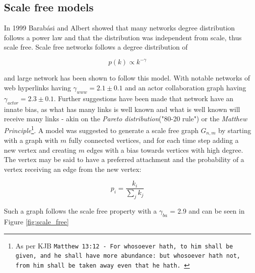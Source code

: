 


\subsection{Scale free models}

In 1999 Barabási and Albert showed that many networks degree distribution follows a power law and that the distribution was independent from scale, thus scale free\cite{barabasi:albert:emergent:scaling}. Scale free networks follows a degree distribution of

\begin{equation}
	 p(k) \propto k^{-\gamma} 
	\label{eq:scale:free}
\end{equation}

and large network has been shown to follow this model. With notable networks of web hyperlinks having $\gamma_{www} = 2.1\pm 0.1$ and an actor collaboration graph having $\gamma_{actor} = 2.3\pm0.1$. Further suggestions have been made that network have an innate bias, as what has many links is well known and what is well known will receive many links - akin on the \textit{Pareto distribution}("80-20 rule") or the \textit{Matthew Principle}\footnote{As per KJB \texttt{Matthew 13:12 - For whosoever hath, to him shall be given, and he shall have more abundance: but whosoever hath not, from him shall be taken away even that he hath.}~\cite{king:james:bible} }. 
A model was suggested to generate a scale free graph $G_{n, m}$ by starting with a graph with $m$ fully connected vertices, and for each time step adding a new vertex and creating $m$ edges with a bias towards vertices with high degree. The vertex may be said to have a preferred attachment and the probability of a vertex receiving an edge from the new vertex:

\[ p_i = \dfrac{k_i}{\sum_{j}^{}k_j}  \]

Such a graph follows the scale free property with a $\gamma_{ba}$ = 2.9 and can be seen in Figure \ref{fig:scale_free}


